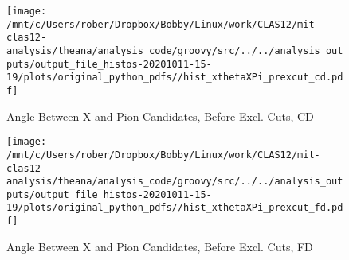 \documentclass{article}
\begin{document}
\begin{landscape}
    \begin{figure}[h]
        \centering

        \texttt{[image: /mnt/c/Users/rober/Dropbox/Bobby/Linux/work/CLAS12/mit-clas12-analysis/theana/analysis\_code/groovy/src/../../analysis\_outputs/output\_file\_histos-20201011-15-19/plots/original\_python\_pdfs//hist\_xthetaXPi\_prexcut\_cd.pdf]}
        \captionsetup{textformat=empty,labelformat=blank}
        \caption{Angle Between X and Pion Candidates, Before Excl. Cuts, CD}
    \end{figure}
    \clearpage
    
    \begin{figure}[h]
        \centering

        \texttt{[image: /mnt/c/Users/rober/Dropbox/Bobby/Linux/work/CLAS12/mit-clas12-analysis/theana/analysis\_code/groovy/src/../../analysis\_outputs/output\_file\_histos-20201011-15-19/plots/original\_python\_pdfs//hist\_xthetaXPi\_prexcut\_fd.pdf]}
        \captionsetup{textformat=empty,labelformat=blank}
        \caption{Angle Between X and Pion Candidates, Before Excl. Cuts, FD}
    \end{figure}
    \clearpage
    
	\end{landscape}
	
\end{document}
